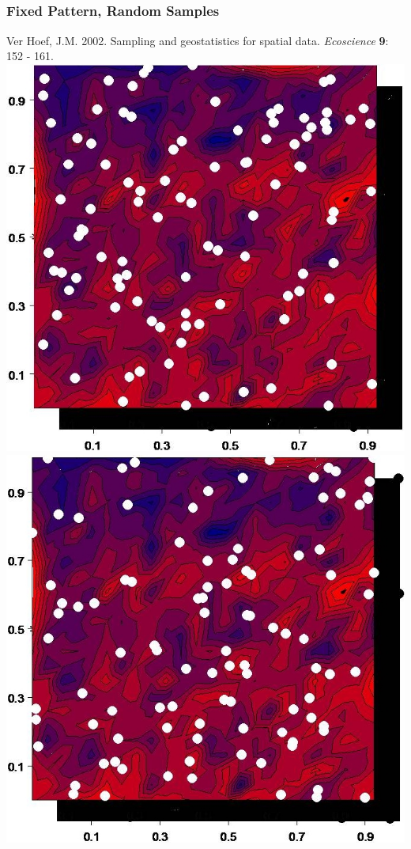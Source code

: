 \documentclass[mathserif,compress]{beamer}\usepackage{graphicx, color}
\makeatletter
\def\maxwidth{ %
  \ifdim\Gin@nat@width>\linewidth
    \linewidth
  \else
    \Gin@nat@width
  \fi
}
\makeatother
\begin{document}
\subsection{}
\begin{frame}[fragile]
\frametitle{Fixed Pattern, Random Samples}
\vspace{-.3cm}
\tiny
Ver Hoef, J.M.  2002.  Sampling and geostatistics for spatial data.  {\it Ecoscience} {\bf 9}: 152 - 161.\\
\vspace{.3cm}
	\includegraphics[width=.5\maxwidth]{figure/fixedPatternRandSamp1.jpg}
	\includegraphics[width=.5\maxwidth]{figure/fixedPatternRandSamp2.jpg}

\end{frame}
\end{document}
